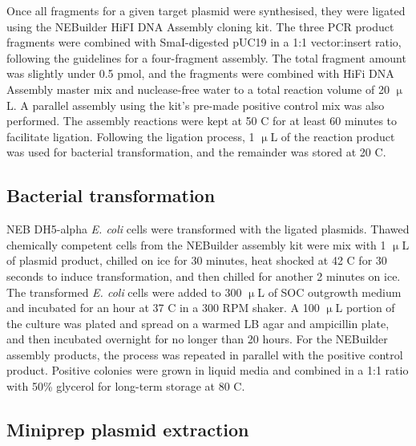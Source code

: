 \documentclass[withindex,glossary]{cam-thesis}
\begin{document}
Once all fragments for a given target plasmid were synthesised, they
were ligated using the NEBuilder HiFI DNA Assembly cloning kit. The
three PCR product fragments were combined with SmaI-digested
pUC19 in a 1:1 vector:insert ratio, following the guidelines for a
four-fragment assembly. The total fragment amount was slightly under 0.5
pmol, and the fragments were combined with HiFi DNA Assembly master mix
and nuclease-free water to a total reaction volume of 20 $\upmu{}$L. A parallel
assembly using the kit's pre-made positive control mix was also
performed. The assembly reactions were kept at 50 \textdegree{}C for at least 60
minutes to facilitate ligation. Following the ligation process, 1 $\upmu{}$L of
the reaction product was used for bacterial transformation, and the
remainder was stored at \textminus{}20 \textdegree{}C.

\subsection{Bacterial transformation}

NEB DH5-alpha \emph{E. coli} cells were transformed with the ligated
plasmids. Thawed chemically competent cells from the NEBuilder assembly
kit were mix with 1 $\upmu{}$L of plasmid product, chilled on ice for 30
minutes, heat shocked at 42 \textdegree{}C for 30 seconds to induce transformation,
and then chilled for another 2 minutes on ice. The transformed \emph{E.
coli} cells were added to 300 $\upmu{}$L of SOC outgrowth medium and incubated
for an hour at 37 \textdegree{}C in a 300 RPM shaker. A 100 $\upmu{}$L portion of the
culture was plated and spread on a warmed LB agar and ampicillin
plate, and then incubated overnight for no longer than 20 hours. For the
NEBuilder assembly products, the process was repeated in parallel with
the positive control product. Positive colonies were grown in liquid
media and combined in a 1:1 ratio with 50\% glycerol for long-term
storage at \textminus{}80 \textdegree{}C.

\subsection{Miniprep plasmid extraction}
\end{document}
